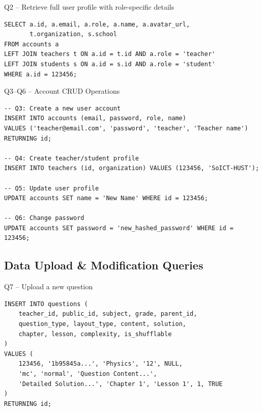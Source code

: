 \documentclass[aspectratio=169, 10pt]{beamer}
\begin{document}
\begin{frame}[fragile]{Q2 -- Retrieve full user profile with role-specific details}
    \begin{lstlisting}
SELECT a.id, a.email, a.role, a.name, a.avatar_url,
       t.organization, s.school
FROM accounts a
LEFT JOIN teachers t ON a.id = t.id AND a.role = 'teacher'
LEFT JOIN students s ON a.id = s.id AND a.role = 'student'
WHERE a.id = 123456;
    \end{lstlisting}
\end{frame}


\begin{frame}[fragile]{Q3--Q6 -- Account CRUD Operations}
    \begin{lstlisting}
-- Q3: Create a new user account
INSERT INTO accounts (email, password, role, name) 
VALUES ('teacher@email.com', 'password', 'teacher', 'Teacher name')
RETURNING id;

-- Q4: Create teacher/student profile
INSERT INTO teachers (id, organization) VALUES (123456, 'SoICT-HUST');

-- Q5: Update user profile
UPDATE accounts SET name = 'New Name' WHERE id = 123456;

-- Q6: Change password
UPDATE accounts SET password = 'new_hashed_password' WHERE id = 123456;
    \end{lstlisting}
\end{frame}


\subsection{Data Upload \& Modification Queries}

\begin{frame}[fragile]{Q7 -- Upload a new question}
    \begin{lstlisting}
INSERT INTO questions (
    teacher_id, public_id, subject, grade, parent_id,
    question_type, layout_type, content, solution,
    chapter, lesson, complexity, is_shufflable
)
VALUES (
    123456, '1b95845a...', 'Physics', '12', NULL,
    'mc', 'normal', 'Question Content...', 
    'Detailed Solution...', 'Chapter 1', 'Lesson 1', 1, TRUE
)
RETURNING id;
    \end{lstlisting}
\end{frame}
\end{document}
